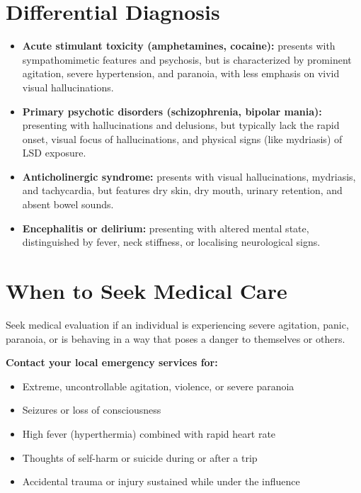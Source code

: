 \section*{Differential Diagnosis}
\begin{itemize}
    \item \textbf{Acute stimulant toxicity (amphetamines, cocaine):} presents with sympathomimetic features and psychosis, but is characterized by prominent agitation, severe hypertension, and paranoia, with less emphasis on vivid visual hallucinations.
    \item \textbf{Primary psychotic disorders (schizophrenia, bipolar mania):} presenting with hallucinations and delusions, but typically lack the rapid onset, visual focus of hallucinations, and physical signs (like mydriasis) of LSD exposure.
    \item \textbf{Anticholinergic syndrome:} presents with visual hallucinations, mydriasis, and tachycardia, but features dry skin, dry mouth, urinary retention, and absent bowel sounds.
    \item \textbf{Encephalitis or delirium:} presenting with altered mental state, distinguished by fever, neck stiffness, or localising neurological signs.
\end{itemize}

\section*{When to Seek Medical Care}
Seek medical evaluation if an individual is experiencing severe agitation, panic, paranoia, or is behaving in a way that poses a danger to themselves or others.

\textbf{Contact your local emergency services for:}
\begin{itemize}
    \item Extreme, uncontrollable agitation, violence, or severe paranoia
    \item Seizures or loss of consciousness
    \item High fever (hyperthermia) combined with rapid heart rate
    \item Thoughts of self-harm or suicide during or after a trip
    \item Accidental trauma or injury sustained while under the influence
\end{itemize}

